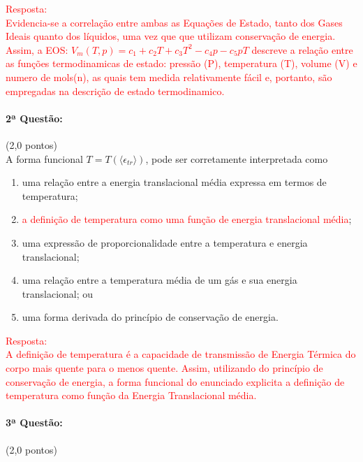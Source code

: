 \documentclass[12pt,a4paper]{article}
\begin{document}
\textcolor{red}{Resposta: \\
Evidencia-se a correlação entre ambas as Equações de Estado, tanto dos Gases Ideais quanto dos líquidos, uma vez que que utilizam conservação de energia.\\
Assim, a EOS: $ V_{m}(T, p) = c_{1} + c_{2}T + c_{3} T^{2} - c_{4} p - c_{5}pT$ descreve a relação entre as funções termodinamicas de estado: pressão (P), temperatura (T), volume (V) e numero de mols(n), as quais tem medida relativamente fácil e, portanto, são empregadas na descrição de estado termodinamico.}

\newpage

\paragraph{2ª Questão:} (2,0 pontos) \\ [0.3cm]


A forma funcional $T = T \left(\langle \epsilon_{tr} \rangle\right)$, pode ser corretamente interpretada como
\begin{enumerate} [label = (\alph*)]
    \item uma relação entre a energia translacional média expressa em termos de temperatura;
    \item \textcolor{red}{a definição de temperatura como uma função de energia translacional média};
    \item uma expressão de proporcionalidade entre a temperatura e energia translacional;
    \item uma relação entre a temperatura média de um gás e sua energia translacional; ou
    \item uma forma derivada do princípio de conservação de energia.  \\ 
\end{enumerate}

\textcolor{red}{Resposta: \\
A definição de temperatura é  a capacidade de transmissão de Energia Térmica do corpo mais quente para o menos quente. Assim, utilizando do princípio de conservação de energia, a forma funcional do enunciado explicita a definição de temperatura como função da Energia Translacional média.} \\[0.1cm]



\paragraph{3ª Questão:} (2,0 pontos) \\ [0.3cm]
\end{document}
